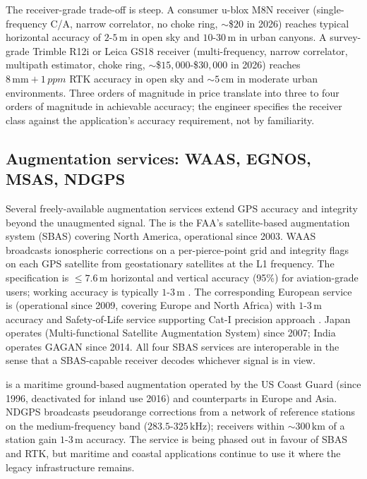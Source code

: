 The receiver-grade trade-off is steep. A consumer u-blox M8N
receiver (single-frequency C/A, narrow correlator, no choke ring,
$\sim$\$$20$ in 2026) reaches typical horizontal accuracy of
$2$-$5 \,\si{\meter}$ in open sky and $10$-$30 \,\si{\meter}$ in
urban canyons. A survey-grade Trimble R12i or Leica GS18 receiver
(multi-frequency, narrow correlator, multipath estimator, choke
ring, $\sim$\$$15{,}000$-\$$30{,}000$ in 2026) reaches $8 \,\si
{\milli\meter} + 1 \,\si{ppm}$ RTK accuracy in open sky and
$\sim 5 \,\si{\centi\meter}$ in moderate urban environments.
Three orders of magnitude in price translate into three to four
orders of magnitude in achievable accuracy; the engineer specifies
the receiver class against the application's accuracy
requirement, not by familiarity.

\subsection{Augmentation services: WAAS, EGNOS, MSAS, NDGPS}

Several freely-available augmentation services extend GPS
accuracy and integrity beyond the unaugmented signal. The
 is the FAA's
satellite-based augmentation system (SBAS) covering North America,
operational since 2003. WAAS broadcasts ionospheric corrections
on a per-pierce-point grid and integrity flags on each GPS
satellite from geostationary satellites at the L1 frequency. The
specification is $\leq 7.6 \,\si{\meter}$ horizontal and vertical
accuracy (95\%) for aviation-grade users; working accuracy is
typically $1$-$3 \,\si{\meter}$ \cite{web:ch06t3-faa-waas-2024}.
The corresponding European service is  (operational
since 2009, covering Europe and North Africa) with $1$-$3 \,\si
{\meter}$ accuracy and Safety-of-Life service supporting Cat-I
precision approach \cite{web:ch06t3-esa-egnos-2024}. Japan
operates  (Multi-functional Satellite Augmentation
System) since 2007; India operates GAGAN since 2014. All four
SBAS services are interoperable in the sense that a SBAS-capable
receiver decodes whichever signal is in view.

 is a maritime
ground-based augmentation operated by the US Coast Guard (since
1996, deactivated for inland use 2016) and counterparts in
Europe and Asia. NDGPS broadcasts pseudorange corrections from a
network of reference stations on the medium-frequency band
($283.5$-$325 \,\si{\kilo\hertz}$); receivers within $\sim 300
\,\si{\kilo\meter}$ of a station gain $1$-$3 \,\si{\meter}$
accuracy. The service is being phased out in favour of SBAS and
RTK, but maritime and coastal applications continue to use it
where the legacy infrastructure remains.

